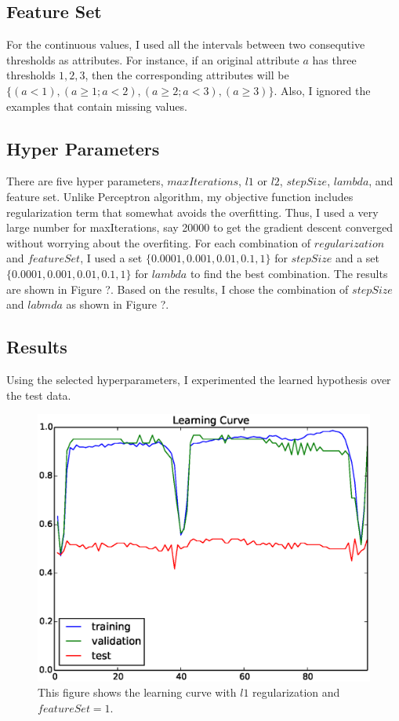 \subsection*{Feature Set}
For the continuous values, I used all the intervals between two consequtive thresholds as attributes. For instance, if an original attribute $a$ has three thresholds ${1, 2, 3}$, then the corresponding attributes will be $\{(a<1),(a\ge 1; a<2),(a\ge 2; a<3),(a\ge 3)\}$. Also, I ignored the examples that contain missing values.

\subsection*{Hyper Parameters}
There are five hyper parameters, $maxIterations$, $l1$ or $l2$, $stepSize$, $lambda$, and feature set. Unlike Perceptron algorithm, my objective function includes regularization term that somewhat avoids the overfitting. Thus, I used a very large number for maxIterations, say 20000 to get the gradient descent converged without worrying about the overfiting. For each combination of $regularization$ and $featureSet$, I used a set $\{0.0001, 0.001, 0.01, 0.1, 1\}$ for $stepSize$ and a set $\{0.0001, 0.001, 0.01, 0.1, 1\}$ for $lambda$ to find the best combination. The results are shown in Figure ?. Based on the results, I chose the combination of $stepSize$ and $labmda$ as shown in Figure ?.

\subsection*{Results}
Using the selected hyperparameters, I experimented the learned hypothesis over the test data.

\begin{figure}[hbtp]
\centering
\includegraphics[width=140mm]{learning_curve_l1_1}
\caption{This figure shows the learning curve with $l1$ regularization and $featureSet=1$.}
\label{fig:learning_curve_l1_1}
\end{figure}

